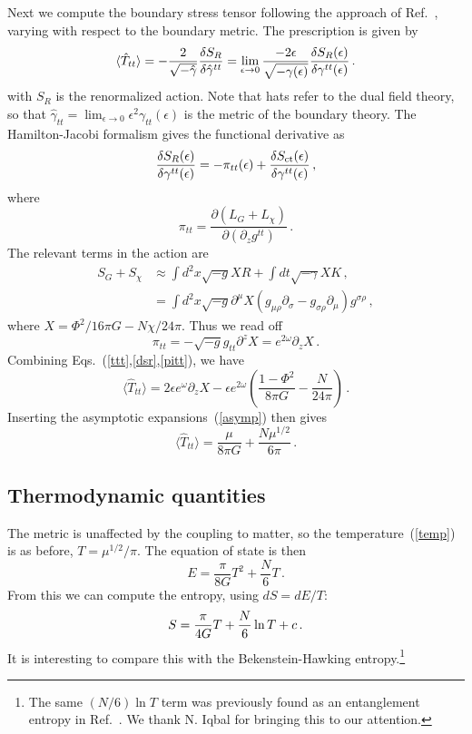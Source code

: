 \documentclass[12pt]{article}
\newcommand{\JP}[1]{{\emph{\textcolor{red}{#1}}}}
\newcommand{\be}{\begin{equation}}
\newcommand{\ee}{\end{equation}}
\begin{document}
{Next we compute the boundary stress tensor following the approach of Ref.~\cite{Balasubramanian:1999re}, varying with respect to the boundary metric. The prescription is given by
\begin{align}
\langle \hat T_{tt} \rangle = -{2 \over \sqrt{-\hat\gamma}} {\delta S_R \over \delta \hat\gamma^{tt}} = \lim_{\epsilon \rightarrow 0}{-2\epsilon \over \sqrt{-\gamma(\epsilon)}} {\delta S_R(\epsilon) \over \delta \gamma^{tt}(\epsilon)} \,. \label{ttt}
\end{align}
with $S_R$ is the renormalized action.  Note that hats refer to the dual field theory, so that $\hat\gamma_{tt} = \lim_{\epsilon \to 0} \epsilon^2 \gamma_{tt}(\epsilon)$ is the metric of the boundary theory. The Hamilton-Jacobi formalism gives the functional derivative as
\be
{\delta S_R(\epsilon) \over \delta \gamma^{tt}(\epsilon)} = -\pi_{tt}(\epsilon) + {\delta S_{\rm ct}(\epsilon) \over \delta \gamma^{tt}(\epsilon)}  \,,  \label{dsr}
\ee
where
\be
\pi_{tt} = \frac{\partial(L_G + L_\chi)}{\partial (\partial_z g^{tt})}   \,.
\ee
The relevant terms in the action are 
\begin{align}
S_G + S_\chi &\approx  \int d^2x \sqrt{-g} X R
+ \int dt \sqrt{-\gamma} X K\,,  \nonumber\\
&= \int d^2x \sqrt{-g} \partial^\mu X (g_{\mu\rho} \partial_\sigma - g_{\sigma\rho} \partial_\mu) g^{\sigma\rho}  \,,
\end{align}
where $X = \Phi^2/16\pi G - N\chi/24\pi$.  Thus we read off 
\be
\pi_{tt} = -  \sqrt{-g} g_{tt} \partial^z X = e^{2\omega} \partial_z X \,. \label{pitt}
\ee
Combining Eqs.~(\ref{ttt},\ref{dsr},\ref{pitt}), we have
\be
\langle \hat T_{tt} \rangle =  2 \epsilon e^\omega \partial_z X - \epsilon e^{2\omega} \left( \frac{1-\Phi^2}{8\pi G} - \frac{N}{24\pi} \right) \,.
\ee
Inserting the asymptotic expansions~(\ref{asymp}) then gives
\be
\langle \hat T_{tt} \rangle = \frac{\mu }{8\pi G} + \frac{N \mu^{1/2}}{6\pi}  \,.  \label{energy}
\ee


\subsection{Thermodynamic quantities}

The metric is unaffected by the coupling to matter, so the temperature~(\ref{temp}) is as before, $T = \mu^{1/2} / \pi$.
The equation of state is then 
\be
E = \frac{\pi}{8 G}  T^2 + \frac{N}{6}T \,. \label{energ}
\ee
From this we can compute the entropy, using $dS = dE/T$:
\begin{align}
S = \frac{\pi}{4 G}   T + { N \over 6} \ln{T} + c \,.  \label{sholo}
\end{align}
It is interesting to compare this with the Bekenstein-Hawking entropy.\footnote{The same $(N/6) \ln T$ term was previously found as an entanglement entropy in Ref.~\cite{Spradlin:1999bn}.  We thank N. Iqbal for bringing this to our attention.}

}
\end{document}
